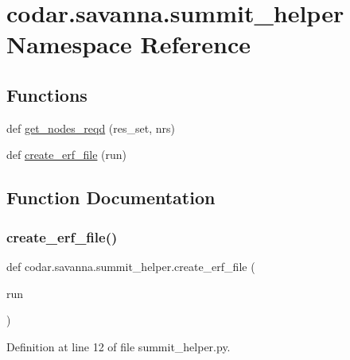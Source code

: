\hypertarget{namespacecodar_1_1savanna_1_1summit__helper}{}\section{codar.\+savanna.\+summit\+\_\+helper Namespace Reference}
\label{namespacecodar_1_1savanna_1_1summit__helper}
\subsection*{Functions}
\begin{DoxyCompactItemize}
\item 
def \hyperlink{namespacecodar_1_1savanna_1_1summit__helper_ab4b35a5de6e32c89007661df713702b1}{get\+\_\+nodes\+\_\+reqd} (res\+\_\+set, nrs)
\item 
def \hyperlink{namespacecodar_1_1savanna_1_1summit__helper_ab7c45efb13fd607274c08a1bc1418aea}{create\+\_\+erf\+\_\+file} (run)
\end{DoxyCompactItemize}


\subsection{Function Documentation}
\mbox{\label{namespacecodar_1_1savanna_1_1summit__helper_ab7c45efb13fd607274c08a1bc1418aea}} 
\subsubsection{\texorpdfstring{create\+\_\+erf\+\_\+file()}{create\_erf\_file()}}
{\footnotesize\ttfamily def codar.\+savanna.\+summit\+\_\+helper.\+create\+\_\+erf\+\_\+file (\begin{DoxyParamCaption}\item[{}]{run }\end{DoxyParamCaption})}



Definition at line 12 of file summit\+\_\+helper.\+py.

\mbox{\label{namespacecodar_1_1savanna_1_1summit__helper_ab4b35a5de6e32c89007661df713702b1}} 

